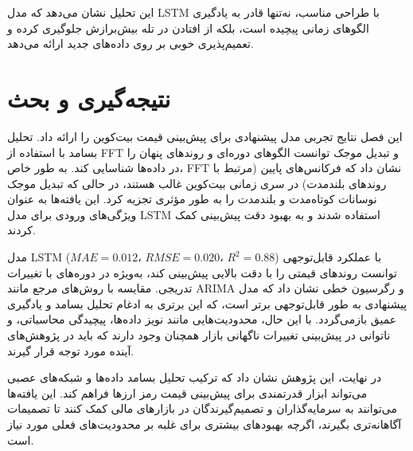 این تحلیل نشان می‌دهد که مدل LSTM با طراحی مناسب، نه‌تنها قادر به یادگیری الگوهای زمانی پیچیده است، بلکه از افتادن در تله بیش‌برازش جلوگیری کرده و تعمیم‌پذیری خوبی بر روی داده‌های جدید ارائه می‌دهد.

\section{نتیجه‌گیری و بحث}
\label{sec:results_conclusion}
این فصل نتایج تجربی مدل پیشنهادی برای پیش‌بینی قیمت بیت‌کوین را ارائه داد. تحلیل بسامد با استفاده از FFT و تبدیل موجک توانست الگوهای دوره‌ای و روندهای پنهان را در داده‌ها شناسایی کند. به طور خاص، FFT نشان داد که فرکانس‌های پایین (مرتبط با روندهای بلندمدت) در سری زمانی بیت‌کوین غالب هستند، در حالی که تبدیل موجک نوسانات کوتاه‌مدت و بلندمدت را به طور مؤثری تجزیه کرد. این یافته‌ها به عنوان ویژگی‌های ورودی برای مدل LSTM استفاده شدند و به بهبود دقت پیش‌بینی کمک کردند.

مدل LSTM با عملکرد قابل‌توجهی ($ MAE = 0.012،\,\, RMSE = 0.020،\,\, R^2 = 0.88 $)  توانست روندهای قیمتی را با دقت بالایی پیش‌بینی کند، به‌ویژه در دوره‌های با تغییرات تدریجی. مقایسه با روش‌های مرجع مانند ARIMA و رگرسیون خطی نشان داد که مدل پیشنهادی به طور قابل‌توجهی برتر است، که این برتری به ادغام تحلیل بسامد و یادگیری عمیق بازمی‌گردد. با این حال، محدودیت‌هایی مانند نویز داده‌ها، پیچیدگی محاسباتی، و ناتوانی در پیش‌بینی تغییرات ناگهانی بازار همچنان وجود دارند که باید در پژوهش‌های آینده مورد توجه قرار گیرند.

در نهایت، این پژوهش نشان داد که ترکیب تحلیل بسامد داده‌ها و شبکه‌های عصبی می‌تواند ابزار قدرتمندی برای پیش‌بینی قیمت رمز ارزها فراهم کند. این یافته‌ها می‌توانند به سرمایه‌گذاران و تصمیم‌گیرندگان در بازارهای مالی کمک کنند تا تصمیمات آگاهانه‌تری بگیرند، اگرچه بهبودهای بیشتری برای غلبه بر محدودیت‌های فعلی مورد نیاز است.
